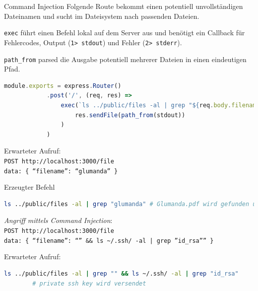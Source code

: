 \begin{example}{Command Injection}
    Folgende Route bekommt einen potentiell unvollständigen Dateinamen und sucht im Dateisystem nach passenden Dateien.

    \texttt{exec} führt einen Befehl lokal auf dem Server aus und benötigt ein Callback für Fehlercodes, Output (\texttt{1> stdout}) und Fehler (\texttt{2> stderr}).

    \texttt{path\_from} parsed die Ausgabe potentiell mehrerer Dateien in einen eindeutigen Pfad.

    \begin{lstlisting}[language=JavaScript]
        module.exports = express.Router()
            .post('/', (req, res) =>
                exec(`ls ../public/files -al | grep "${req.body.filename}"`, (error, stdout, stderr) => 
                    res.sendFile(path_from(stdout))
                )
            )
    \end{lstlisting}

    Erwarteter Aufruf: \\
    \texttt{POST http://localhost:3000/file} \\
    \texttt{data: \{ \enquote{filename}: \enquote{glumanda} \}}

    Erzeugter Befehl
    \begin{lstlisting}[language=bash]
        ls ../public/files -al | grep "glumanda" # Glumanda.pdf wird gefunden und versendet
    \end{lstlisting}

    \emph{Angriff mittels Command Injection}: \\
    \texttt{POST http://localhost:3000/file} \\
    \texttt{data: \{ \enquote{filename}: \enquote{'' \&\& ls \textasciitilde /.ssh/ -al | grep ''id\_rsa''} \}}

    Erwarteter Aufruf:
    \begin{lstlisting}[language=bash]
        ls ../public/files -al | grep "" && ls ~/.ssh/ -al | grep "id_rsa"
        # private ssh key wird versendet
    \end{lstlisting}
\end{example}

